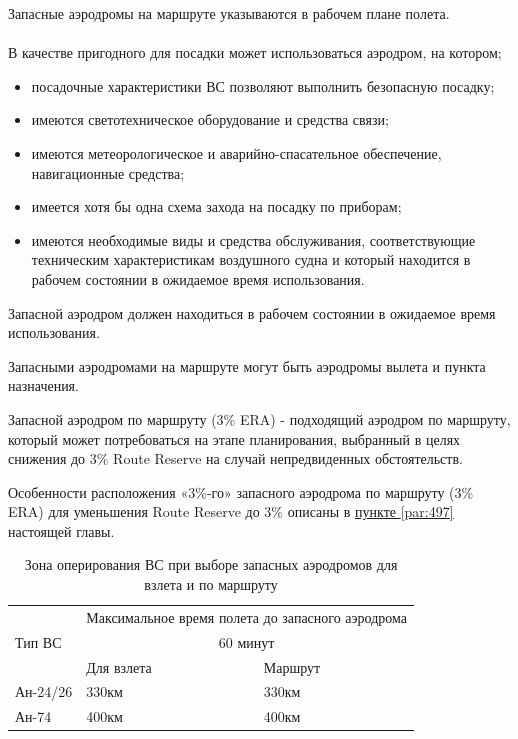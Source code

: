 Запасные аэродромы на маршруте указываются в рабочем плане полета.

\paragraph{} В качестве пригодного для посадки может использоваться аэродром, на котором;
\begin{itemize}
    \item посадочные характеристики ВС позволяют выполнить безопасную посадку;
    \item имеются светотехническое оборудование и средства связи;
    \item имеются метеорологическое и аварийно-спасательное обеспечение, навигационные средства;
    \item имеется хотя бы одна схема захода на посадку по приборам;
    \item имеются необходимые виды и средства обслуживания, соответствующие техническим характеристикам воздушного судна и который находится в рабочем состоянии в ожидаемое время использования.
\end{itemize}

Запасной аэродром должен находиться в рабочем состоянии в ожидаемое время использования.

Запасными аэродромами на маршруте могут быть аэродромы вылета и пункта назначения.

Запасной аэродром по маршруту (3\% ERA) - подходящий аэродром по маршруту, который может потребоваться на этапе планирования, выбранный в целях снижения до 3\% Route Reserve на случай непредвиденных обстоятельств.

Особенности расположения «3\%-го» запасного аэродрома по маршруту (3\% ERA) для уменьшения Route Reserve до 3\% описаны в \hyperref[par:497]{пункте \ref*{par:497}} настоящей главы.


\begin{table}[H]
    \begin{center}
    \caption{Зона оперирования ВС при выборе запасных аэродромов для взлета и по маршруту} \label{tbl:altto}
    \begin{tabular}{|p{}|p{}|p{}|}
    \hline
    &\multicolumn{2}{c|}{Максимальное время полета до запасного аэродрома}\\
    \cline{2-3}
    Тип ВС&\multicolumn{2}{c|}{60 минут}\\
    \cline{2-3}
    &Для взлета&Маршрут\\
    \hline
    Ан-24/26	&330км	&330км\\
    \hline
    Ан-74	    &400км	&400км\\
    \hline\hline


    \end{tabular}
    \end{center}
\end{table}

